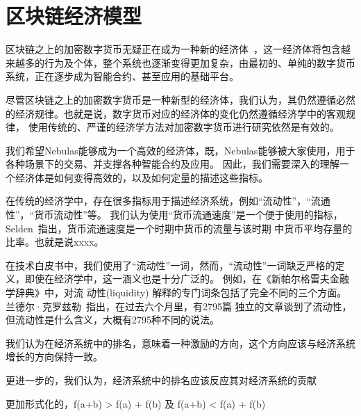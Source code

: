 \section{区块链经济模型}
区块链之上的加密数字货币无疑正在成为一种新的经济体~\cite{neweco}，这一经济体将包含越来越多的行为及个体，整个系统也逐渐变得更加复杂，由最初的、单纯的数字货币系统，正在逐步成为智能合约、甚至应用的基础平台。

尽管区块链之上的加密数字货币是一种新型的经济体，我们认为，其仍然遵循必然的经济规律。也就是说，数字货币对应的经济体的变化仍然遵循经济学中的客观规律，
使用传统的、严谨的经济学方法对加密数字货币进行研究依然是有效的。

我们希望Nebulas能够成为一个高效的经济体，既，Nebulas能够被大家使用，用于各种场景下的交易、并支撑各种智能合约及应用。
因此，我们需要深入的理解一个经济体是如何变得高效的，以及如何定量的描述这些指标。

在传统的经济学中，存在很多指标用于描述经济系统，例如``流动性''，``流通性''，``货币流动性''等。
我们认为使用``货币流通速度''是一个便于使用的指标，Selden~\cite{selden}指出，货币流通速度是一个时期中货币的流量与该时期
中货币平均存量的比率。也就是说xxxx。

{ 在技术白皮书中，我们使用了``流动性''一词，然而，``流动性''一词缺乏严格的定义，即使在经济学中，这一涵义也是十分广泛的。
例如，在《新帕尔格雷夫金融学辞典》中，对流
动性(liquidity) 解释的专门词条包括了完全不同的三个方面。兰德尔·克罗兹勒~\cite{randall}指出，在过去六个月里，有2795篇
独立的文章谈到了流动性，但流动性是什么含义，大概有2795种不同的说法。}



我们认为在经济系统中的排名，意味着一种激励的方向，这个方向应该与经济系统增长的方向保持一致。

更进一步的，我们认为，经济系统中的排名应该反应其对经济系统的贡献

更加形式化的，f(a+b) > f(a) + f(b) 及 f(a+b) < f(a) + f(b)
